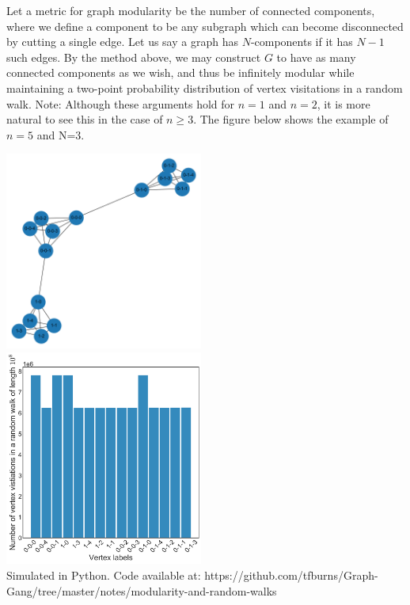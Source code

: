 \documentclass{article}
\begin{document}
Let a metric for graph modularity be the number of connected components, where we define a component to be any subgraph which can become disconnected by cutting a single edge. Let us say a graph has $N$-components if it has $N-1$ such edges. By the method above, we may construct $G$ to have as many connected components as we wish, and thus be infinitely modular while maintaining a two-point probability distribution of vertex visitations in a random walk. Note: Although these arguments hold for $n=1$ and $n=2$, it is more natural to see this in the case of $n\geq3$. The figure below shows the example of $n=5$ and N=3.

\begin{center}
    \includegraphics[width=6.5cm]{K5_K5_K5.png}
    \\
    \includegraphics[width=6.5cm]{K5_K5_K5_dist.png}
    \\
    Simulated in Python. Code available at: https://github.com/tfburns/Graph-Gang/tree/master/notes/modularity-and-random-walks
\end{center}
\end{document}
